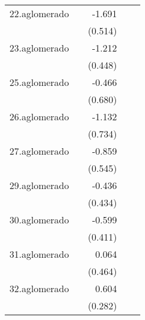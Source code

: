 {\begin{longtable}{l*{4}{D{.}{.}{-1}}}
\addlinespace
22.aglomerado&                     &      -1.691\sym{***}&                     &                     \\
            &                     &     (0.514)         &                     &                     \\
\addlinespace
23.aglomerado&                     &      -1.212\sym{**} &                     &                     \\
            &                     &     (0.448)         &                     &                     \\
\addlinespace
25.aglomerado&                     &      -0.466         &                     &                     \\
            &                     &     (0.680)         &                     &                     \\
\addlinespace
26.aglomerado&                     &      -1.132         &                     &                     \\
            &                     &     (0.734)         &                     &                     \\
\addlinespace
27.aglomerado&                     &      -0.859         &                     &                     \\
            &                     &     (0.545)         &                     &                     \\
\addlinespace
29.aglomerado&                     &      -0.436         &                     &                     \\
            &                     &     (0.434)         &                     &                     \\
\addlinespace
30.aglomerado&                     &      -0.599         &                     &                     \\
            &                     &     (0.411)         &                     &                     \\
\addlinespace
31.aglomerado&                     &       0.064         &                     &                     \\
            &                     &     (0.464)         &                     &                     \\
\addlinespace
32.aglomerado&                     &       0.604\sym{*}  &                     &                     \\
            &                     &     (0.282)         &                     &                     \\

\end{longtable}}
